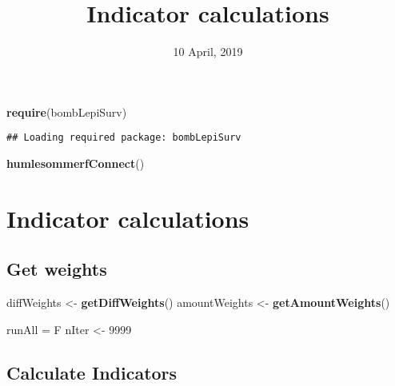 \documentclass[]{article}
\title{Indicator calculations}
\author{}
\date{10 April, 2019}
\newenvironment{Shaded}{\begin{snugshade}}{\end{snugshade}}
\newcommand{\KeywordTok}[1]{\textcolor[rgb]{0.13,0.29,0.53}{\textbf{#1}}}
\newcommand{\DecValTok}[1]{\textcolor[rgb]{0.00,0.00,0.81}{#1}}
\newcommand{\StringTok}[1]{\textcolor[rgb]{0.31,0.60,0.02}{#1}}
\newcommand{\NormalTok}[1]{#1}
\begin{document}
\maketitle

{
\setcounter{tocdepth}{2}
\tableofcontents
}
\begin{Shaded}
\begin{Highlighting}[]
\KeywordTok{require}\NormalTok{(bombLepiSurv)}
\end{Highlighting}
\end{Shaded}

\begin{verbatim}
## Loading required package: bombLepiSurv
\end{verbatim}

\begin{Shaded}
\begin{Highlighting}[]
\KeywordTok{humlesommerfConnect}\NormalTok{()}
\end{Highlighting}
\end{Shaded}

\section{Indicator calculations}\label{indicator-calculations}

\subsection{Get weights}\label{get-weights}

\begin{Shaded}
\begin{Highlighting}[]
\NormalTok{diffWeights <-}\StringTok{ }\KeywordTok{getDiffWeights}\NormalTok{()}
\NormalTok{amountWeights <-}\StringTok{ }\KeywordTok{getAmountWeights}\NormalTok{()}
\end{Highlighting}
\end{Shaded}

\begin{Shaded}
\begin{Highlighting}[]
\NormalTok{runAll =}\StringTok{ }\NormalTok{F}
\NormalTok{nIter <-}\StringTok{ }\DecValTok{9999}
\end{Highlighting}
\end{Shaded}

\subsection{Calculate Indicators}\label{calculate-indicators}
\end{document}
